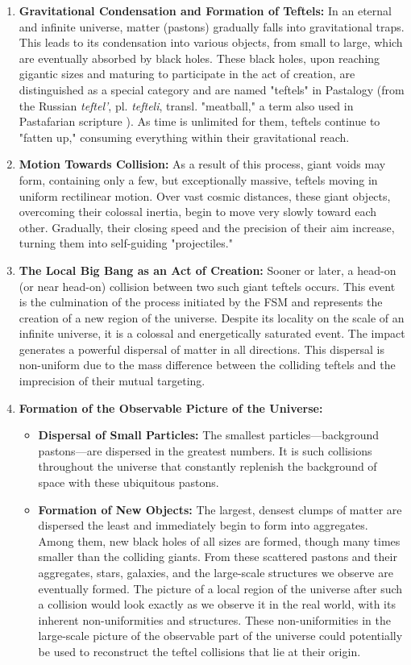 \documentclass[pdflatex,sn-mathphys-num,referee]{sn-jnl}
\begin{document}
\begin{enumerate}
    \item \textbf{Gravitational Condensation and Formation of Teftels:} In an eternal and infinite universe, matter (pastons) gradually falls into gravitational traps. This leads to its condensation into various objects, from small to large, which are eventually absorbed by black holes. These black holes, upon reaching gigantic sizes and maturing to participate in the act of creation, are distinguished as a special category and are named "teftels" in Pastalogy (from the Russian \textit{teftel'}, pl. \textit{tefteli}, transl. "meatball," a term also used in Pastafarian scripture \cite{henderson2006}). As time is unlimited for them, teftels continue to "fatten up," consuming everything within their gravitational reach.
    \item \textbf{Motion Towards Collision:} As a result of this process, giant voids may form, containing only a few, but exceptionally massive, teftels moving in uniform rectilinear motion. Over vast cosmic distances, these giant objects, overcoming their colossal inertia, begin to move very slowly toward each other. Gradually, their closing speed and the precision of their aim increase, turning them into self-guiding "projectiles."
    \item \textbf{The Local Big Bang as an Act of Creation:} Sooner or later, a head-on (or near head-on) collision between two such giant teftels occurs. This event is the culmination of the process initiated by the FSM and represents the creation of a new region of the universe. Despite its locality on the scale of an infinite universe, it is a colossal and energetically saturated event. The impact generates a powerful dispersal of matter in all directions. This dispersal is non-uniform due to the mass difference between the colliding teftels and the imprecision of their mutual targeting.
    \item \textbf{Formation of the Observable Picture of the Universe:}
    \begin{itemize}
        \item \textbf{Dispersal of Small Particles:} The smallest particles---background pastons---are dispersed in the greatest numbers. It is such collisions throughout the universe that constantly replenish the background of space with these ubiquitous pastons.
        \item \textbf{Formation of New Objects:} The largest, densest clumps of matter are dispersed the least and immediately begin to form into aggregates. Among them, new black holes of all sizes are formed, though many times smaller than the colliding giants. From these scattered pastons and their aggregates, stars, galaxies, and the large-scale structures we observe are eventually formed. The picture of a local region of the universe after such a collision would look exactly as we observe it in the real world, with its inherent non-uniformities and structures. These non-uniformities in the large-scale picture of the observable part of the universe could potentially be used to reconstruct the teftel collisions that lie at their origin.
    \end{itemize}
\end{enumerate}
\end{document}
